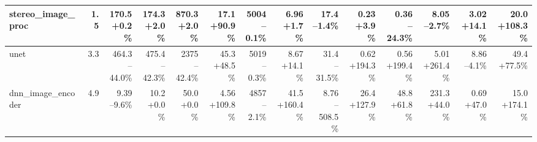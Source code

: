 \begin{table}[t]
{\begin{tabular}{lrrrrrrrrrrrrr}
\midrule
stereo\_image\_proc & 1.5 & \makecell[r]{170.5\\+0.2\%} & \makecell[r]{174.3\\+2.0\%} & \makecell[r]{870.3\\+2.0\%} & \makecell[r]{17.1\\+90.9\%} & \makecell[r]{5004\\--0.1\%} & \makecell[r]{6.96\\+1.7\%} & \makecell[r]{17.4\\--1.4\%} & \makecell[r]{0.23\\+3.9\%} & \makecell[r]{0.36\\--24.3\%} & \makecell[r]{8.05\\--2.7\%} & \makecell[r]{3.02\\+14.1\%} & \makecell[r]{20.0\\+108.3\%} \\
\midrule
unet & 3.3 & \makecell[r]{464.3\\--44.0\%} & \makecell[r]{475.4\\--42.3\%} & \makecell[r]{2375\\--42.4\%} & \makecell[r]{45.3\\+48.5\%} & \makecell[r]{5019\\--0.3\%} & \makecell[r]{8.67\\+14.1\%} & \makecell[r]{31.4\\--31.5\%} & \makecell[r]{0.62\\+194.3\%} & \makecell[r]{0.56\\+199.4\%} & \makecell[r]{5.01\\+261.4\%} & \makecell[r]{8.86\\--4.1\%} & \makecell[r]{49.4\\+77.5\%} \\
\midrule
dnn\_image\_encoder & 4.9 & \makecell[r]{9.39\\--9.6\%} & \makecell[r]{10.2\\+0.0\%} & \makecell[r]{50.0\\+0.0\%} & \makecell[r]{4.56\\+109.8\%} & \makecell[r]{4857\\--2.1\%} & \makecell[r]{41.5\\+160.4\%} & \makecell[r]{8.76\\--508.5\%} & \makecell[r]{26.4\\+127.9\%} & \makecell[r]{48.8\\+61.8\%} & \makecell[r]{231.3\\+44.0\%} & \makecell[r]{0.69\\+47.0\%} & \makecell[r]{15.0\\+174.1\%} \\

\end{tabular}}
\end{table}
